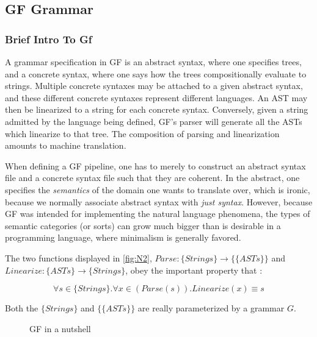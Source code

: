 \documentclass{article}
\begin{document}
\subsection{GF Grammar}

\subsubsection{Brief Intro To Gf}

A grammar specification in GF is an abstract syntax, where one specifies trees,
and a concrete syntax, where one says how the trees compositionally evaluate to
strings. Multiple concrete syntaxes may be attached to a given abstract syntax,
and these different concrete syntaxes represent different languages. An AST may
then be linearized to a string for each concrete syntax. Conversely, given a
string admitted by the language being defined, GF's parser will generate all the
ASTs which linearize to that tree. The composition of parsing and linearization
amounts to machine translation.

When defining a GF pipeline, one has to merely to construct an abstract syntax
file and a concrete syntax file such that they are coherent. In the abstract,
one specifies the \emph{semantics} of the domain one wants to translate over,
which is ironic, because we normally associate abstract syntax with \emph{just
syntax}. However, because GF was intended for implementing the natural language
phenomena, the types of semantic categories (or sorts) can grow much bigger than
is desirable in a programming language, where minimalism is generally favored.

The two functions displayed in \autoref{fig:N2}, $Parse : \{Strings\}
\rightarrow \{\{ASTs\}\}$ and $Linearize : \{ASTs\} \rightarrow \{Strings\}$, obey
the important property that :

$$\forall s \in \{Strings\}. \forall x \in (Parse(s)). Linearize(x) \equiv s$$

Both the $\{Strings\}$ and $\{\{ASTs\}\}$ are really parameterized by a grammar
$G$.

\begin{figure}
\centering
{}
\caption{GF in a nutshell} \label{fig:N2}
\end{figure}
\end{document}
